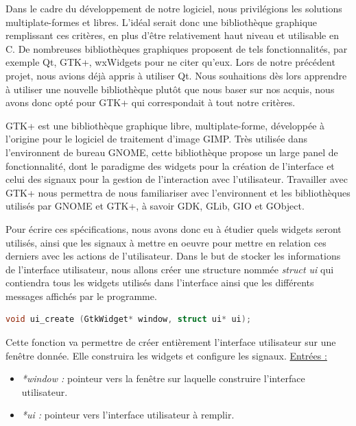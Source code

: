 \documentclass[11pt]{article}
\begin{document}
Dans le cadre du développement de notre logiciel, nous privilégions les
solutions multiplate-formes et libres. L'idéal serait donc une bibliothèque
graphique remplissant ces critères, en plus d'être relativement haut niveau et
utilisable en C. De nombreuses bibliothèques graphiques proposent de tels
fonctionnalités, par exemple Qt, GTK+, wxWidgets pour ne citer qu'eux. Lors de
notre précédent projet, nous avions déjà appris à utiliser Qt. Nous souhaitions
dès lors apprendre à utiliser une nouvelle bibliothèque plutôt que nous baser
sur nos acquis, nous avons donc opté pour GTK+ qui correspondait à tout notre
critères.

GTK+ est une bibliothèque graphique libre, multiplate-forme, développée à
l'origine pour le logiciel de traitement d'image GIMP. Très utilisée dans
l'environnent de bureau GNOME, cette bibliothèque propose un large panel de
fonctionnalité, dont le paradigme des widgets pour la création de l'interface et
celui des signaux pour la gestion de l'interaction avec l'utilisateur.
Travailler avec GTK+ nous permettra de nous familiariser avec l'environnent et
les bibliothèques utilisés par GNOME et GTK+, à savoir GDK, GLib, GIO et
GObject.

Pour écrire ces spécifications, nous avons donc eu à étudier quels widgets
seront utilisés, ainsi que les signaux à mettre en oeuvre pour mettre en
relation ces derniers avec les actions de l'utilisateur. Dans le but de stocker
les informations de l'interface utilisateur, nous allons créer une structure
nommée \textit{struct ui} qui contiendra tous les widgets utilisés dans
l'interface ainsi que les différents messages affichés par le programme. 

\begin{lstlisting}[language=c]
void ui_create (GtkWidget* window, struct ui* ui);
\end{lstlisting}

Cette fonction va permettre de créer entièrement l'interface utilisateur 
sur une fenêtre donnée. Elle construira les widgets et configure les signaux. 
\newline
\underline{Entrées :} 
\begin{itemize}
\item \textit{*window :} pointeur vers la fenêtre sur laquelle construire 
l'interface utilisateur. 
\item \textit{*ui :} pointeur vers l'interface utilisateur à remplir. 
\newline 
\end{itemize}
\end{document}
